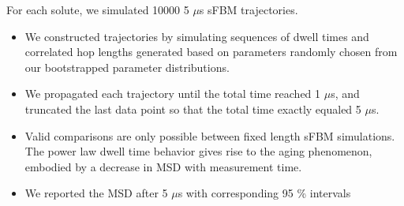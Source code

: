 \documentclass{article}
\begin{document}
  \noindent For each solute, we simulated 10000 5 $\mu$s sFBM trajectories. 
  \begin{itemize}
	\item We constructed trajectories by simulating	sequences of dwell times and correlated 
	hop	lengths generated based on parameters randomly chosen from our bootstrapped parameter
	distributions.
	\item We propagated each trajectory until the total time reached 1 $\mu$s, and truncated
	the last data point so that the total time exactly equaled 5 $\mu$s. 
    \item Valid comparisons are only possible between fixed length sFBM simulations. The
    power law dwell time behavior gives rise to the aging phenomenon, embodied by
    a decrease in MSD with measurement time.~\cite{neusius_subdiffusion_2008,metzler_anomalous_2014}
    \item We reported the MSD after 5 $\mu$s with corresponding 95 \% intervals
  \end{itemize}
\end{document}
